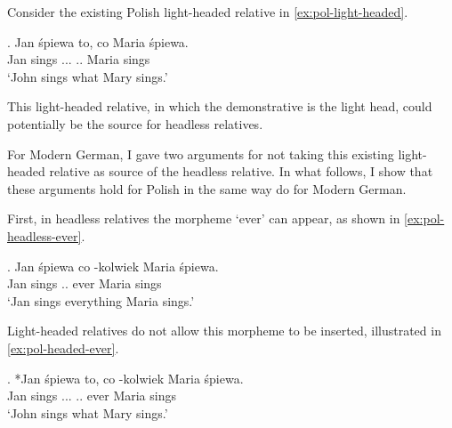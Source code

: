 Consider the existing Polish light-headed relative in \ref{ex:pol-light-headed}.

\exg. Jan śpiewa to, co Maria śpiewa.\\
Jan sings ... .. Maria sings\\
`John sings what Mary sings.' \label{ex:pol-light-headed}

This light-headed relative, in which the demonstrative is the light head, could potentially be the source for headless relatives.

For Modern German, I gave two arguments for not taking this existing light-headed relative as source of the headless relative. In what follows, I show that these arguments hold for Polish in the same way do for Modern German.

First, in headless relatives the morpheme  `ever' can appear, as shown in \ref{ex:pol-headless-ever}.

\exg. Jan śpiewa co -kolwiek Maria śpiewa.\\
Jan sings .. ever Maria sings\\
`Jan sings everything Maria sings.' \label{ex:pol-headless-ever}

Light-headed relatives do not allow this morpheme to be inserted, illustrated in \ref{ex:pol-headed-ever}.

\exg. *Jan śpiewa to, co -kolwiek Maria śpiewa.\\
Jan sings ... .. ever Maria sings\\
`John sings what Mary sings.' \label{ex:pol-headed-ever}

